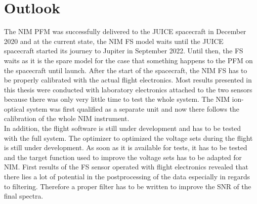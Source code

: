 \section{Outlook}
	
	The NIM PFM was successfully delivered to the JUICE spacecraft in December 2020 and at the current state, the NIM FS model waits until the JUICE spacecraft started its journey to Jupiter in September 2022. Until then, the FS waits as it is the spare model for the case that something happens to the PFM on the spacecraft until launch. After the start of the spacecraft, the NIM FS has to be properly calibrated with the actual flight electronics. Most results presented in this thesis were conducted with laboratory electronics attached to the two sensors because there was only very little time to test the whole system. The NIM ion-optical system was first qualified as a separate unit and now there follows the calibration of the whole NIM instrument.\\
	In addition, the flight software is still under development and has to be tested with the full system. The optimizer to optimized the voltage sets during the flight is still under development. As soon as it is available for tests, it has to be tested and the target function used to improve the voltage sets has to be adapted for NIM. First results of the FS sensor operated with flight electronics revealed that there lies a lot of potential in the postprocessing of the data especially in regards to filtering. Therefore a proper filter has to be written to improve the SNR of the final spectra.
	
